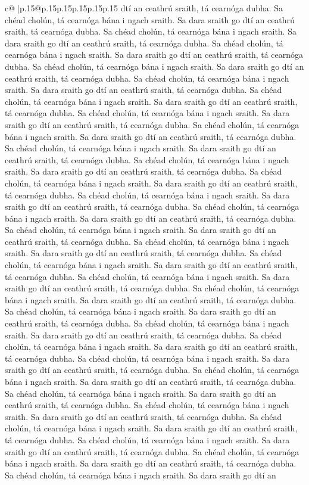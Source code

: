 \documentclass{article}
\begin{document}
{\begin{supertabular}{c@{$\;$}|p{.15\linewidth}@{}p{.15\linewidth}p{.15\linewidth}p{.15\linewidth}p{.15\linewidth}p{.15\linewidth}}
{{{dtí an ceathrú sraith, tá cearnóga dubha. Sa chéad cholún, tá cearnóga bána i ngach sraith. Sa dara sraith go dtí an ceathrú sraith, tá cearnóga dubha. Sa chéad cholún, tá cearnóga bána i ngach sraith. Sa dara sraith go dtí an ceathrú sraith, tá cearnóga dubha. Sa chéad cholún, tá cearnóga bána i ngach sraith. Sa dara sraith go dtí an ceathrú sraith, tá cearnóga dubha. Sa chéad cholún, tá cearnóga bána i ngach sraith. Sa dara sraith go dtí an ceathrú sraith, tá cearnóga dubha. Sa chéad cholún, tá cearnóga bána i ngach sraith. Sa dara sraith go dtí an ceathrú sraith, tá cearnóga dubha. Sa chéad cholún, tá cearnóga bána i ngach sraith. Sa dara sraith go dtí an ceathrú sraith, tá cearnóga dubha. Sa chéad cholún, tá cearnóga bána i ngach sraith. Sa dara sraith go dtí an ceathrú sraith, tá cearnóga dubha. Sa chéad cholún, tá cearnóga bána i ngach sraith. Sa dara sraith go dtí an ceathrú sraith, tá cearnóga dubha. Sa chéad cholún, tá cearnóga bána i ngach sraith. Sa dara sraith go dtí an ceathrú sraith, tá cearnóga dubha. Sa chéad cholún, tá cearnóga bána i ngach sraith. Sa dara sraith go dtí an ceathrú sraith, tá cearnóga dubha. Sa chéad cholún, tá cearnóga bána i ngach sraith. Sa dara sraith go dtí an ceathrú sraith, tá cearnóga dubha. Sa chéad cholún, tá cearnóga bána i ngach sraith. Sa dara sraith go dtí an ceathrú sraith, tá cearnóga dubha. Sa chéad cholún, tá cearnóga bána i ngach sraith. Sa dara sraith go dtí an ceathrú sraith, tá cearnóga dubha. Sa chéad cholún, tá cearnóga bána i ngach sraith. Sa dara sraith go dtí an ceathrú sraith, tá cearnóga dubha. Sa chéad cholún, tá cearnóga bána i ngach sraith. Sa dara sraith go dtí an ceathrú sraith, tá cearnóga dubha. Sa chéad cholún, tá cearnóga bána i ngach sraith. Sa dara sraith go dtí an ceathrú sraith, tá cearnóga dubha. Sa chéad cholún, tá cearnóga bána i ngach sraith. Sa dara sraith go dtí an ceathrú sraith, tá cearnóga dubha. Sa chéad cholún, tá cearnóga bána i ngach sraith. Sa dara sraith go dtí an ceathrú sraith, tá cearnóga dubha. Sa chéad cholún, tá cearnóga bána i ngach sraith. Sa dara sraith go dtí an ceathrú sraith, tá cearnóga dubha. Sa chéad cholún, tá cearnóga bána i ngach sraith. Sa dara sraith go dtí an ceathrú sraith, tá cearnóga dubha. Sa chéad cholún, tá cearnóga bána i ngach sraith. Sa dara sraith go dtí an ceathrú sraith, tá cearnóga dubha. Sa chéad cholún, tá cearnóga bána i ngach sraith. Sa dara sraith go dtí an ceathrú sraith, tá cearnóga dubha. Sa chéad cholún, tá cearnóga bána i ngach sraith. Sa dara sraith go dtí an ceathrú sraith, tá cearnóga dubha. Sa chéad cholún, tá cearnóga bána i ngach sraith. Sa dara sraith go dtí an ceathrú sraith, tá cearnóga dubha. Sa chéad cholún, tá cearnóga bána i ngach sraith. Sa dara sraith go dtí an ceathrú sraith, tá cearnóga dubha. Sa chéad cholún, tá cearnóga bána i ngach sraith. Sa dara sraith go dtí an ceathrú sraith, tá cearnóga dubha. Sa chéad cholún, tá cearnóga bána i ngach sraith. Sa dara sraith go dtí an ceathrú sraith, tá cearnóga dubha. Sa chéad cholún, tá cearnóga bána i ngach sraith. Sa dara sraith go dtí an ceathrú sraith, tá cearnóga dubha. Sa chéad cholún, tá cearnóga bána i ngach sraith. Sa dara sraith go dtí an }}}
\end{supertabular}}
\end{document}
